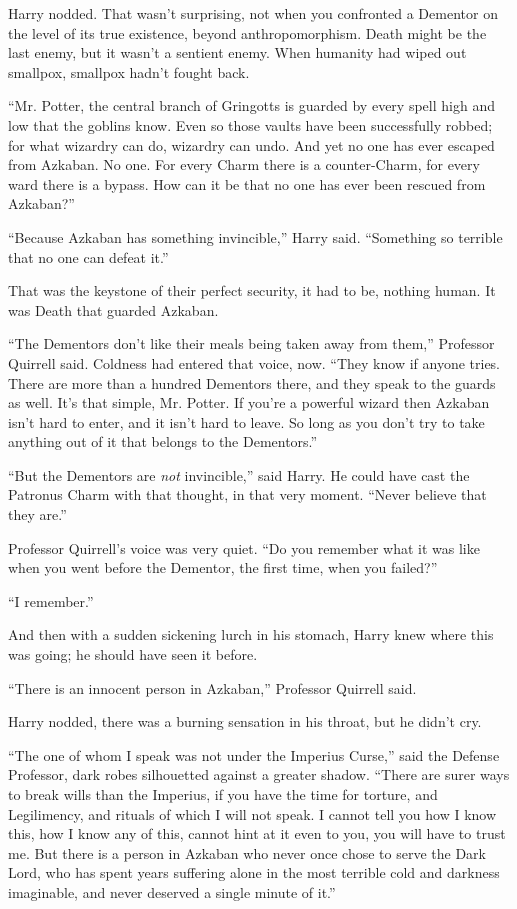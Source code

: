 Harry nodded. That wasn't surprising, not when you confronted a Dementor
on the level of its true existence, beyond anthropomorphism. Death might
be the last enemy, but it wasn't a sentient enemy. When humanity had
wiped out smallpox, smallpox hadn't fought back.

``Mr. Potter, the central branch of Gringotts is guarded by every spell
high and low that the goblins know. Even so those vaults have been
successfully robbed; for what wizardry can do, wizardry can undo. And
yet no one has ever escaped from Azkaban. No one. For every Charm there
is a counter-Charm, for every ward there is a bypass. How can it be that
no one has ever been rescued from Azkaban?''

``Because Azkaban has something invincible,'' Harry said. ``Something so
terrible that no one can defeat it.''

That was the keystone of their perfect security, it had to be, nothing
human. It was Death that guarded Azkaban.

``The Dementors don't like their meals being taken away from them,''
Professor Quirrell said. Coldness had entered that voice, now. ``They
know if anyone tries. There are more than a hundred Dementors there, and
they speak to the guards as well. It's that simple, Mr. Potter. If
you're a powerful wizard then Azkaban isn't hard to enter, and it isn't
hard to leave. So long as you don't try to take anything out of it that
belongs to the Dementors.''

``But the Dementors are \emph{not} invincible,'' said Harry. He could
have cast the Patronus Charm with that thought, in that very moment.
``Never believe that they are.''

Professor Quirrell's voice was very quiet. ``Do you remember what it was
like when you went before the Dementor, the first time, when you
failed?''

``I remember.''

And then with a sudden sickening lurch in his stomach, Harry knew where
this was going; he should have seen it before.

``There is an innocent person in Azkaban,'' Professor Quirrell said.

Harry nodded, there was a burning sensation in his throat, but he didn't
cry.

``The one of whom I speak was not under the Imperius Curse,'' said the
Defense Professor, dark robes silhouetted against a greater shadow.
``There are surer ways to break wills than the Imperius, if you have the
time for torture, and Legilimency, and rituals of which I will not
speak. I cannot tell you how I know this, how I know any of this, cannot
hint at it even to you, you will have to trust me. But there is a person
in Azkaban who never once chose to serve the Dark Lord, who has spent
years suffering alone in the most terrible cold and darkness imaginable,
and never deserved a single minute of it.''

